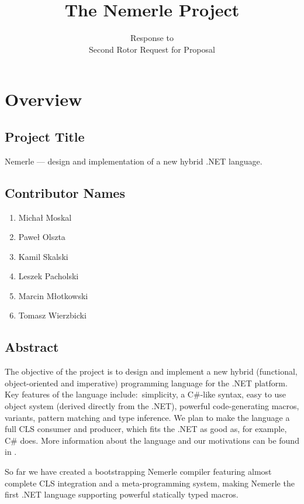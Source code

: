 \documentclass[a4paper,11pt]{article}
\title{The Nemerle Project}
\author{Response to\\Second Rotor Request for Proposal}
\date{}
\begin{document}
\maketitle
\thispagestyle{empty}

\section{Overview}

\subsection{Project Title}

Nemerle --- design and implementation of a new hybrid .NET language.

\subsection{Contributor Names}
\begin{enumerate}\itemsep0pt
\item Micha{\l} Moskal
\item Pawe{\l} Olszta
\item Kamil Skalski
\item Leszek Pacholski
\item Marcin M{\l}otkowski
\item Tomasz Wierzbicki
\end{enumerate}

\subsection{Abstract}

The objective of the project is to design and implement a new 
hybrid (functional, object-oriented and imperative) programming 
language for the .NET platform. Key features of the language 
include:~simplicity, a C\#-like syntax, easy to use object 
system (derived directly from the .NET), powerful code-generating 
macros, variants, pattern matching and type inference. We plan 
to make the language a full CLS consumer and producer, which 
fits the .NET as good as, for example, C\# does. More information
about the language and our motivations can be found in \cite{Intro}.

So far we have created a bootstrapping Nemerle compiler featuring
almost complete CLS integration and a meta-programming system,
making Nemerle the first .NET language supporting powerful 
statically typed macros.
\end{document}
